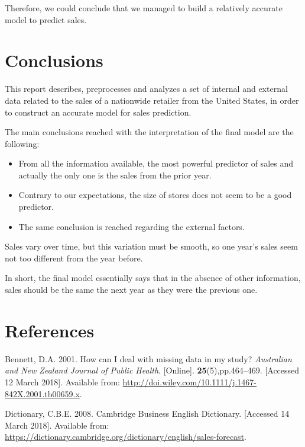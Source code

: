 \documentclass[11pt,]{article}
\providecommand{\tightlist}{%
  \setlength{\itemsep}{0pt}\setlength{\parskip}{0pt}}
\begin{document}
Therefore, we could conclude that we managed to build a relatively
accurate model to predict sales.

\section{Conclusions}\label{conclusions}

This report describes, preprocesses and analyzes a set of internal and
external data related to the sales of a nationwide retailer from the
United States, in order to construct an accurate model for sales
prediction.

The main conclusions reached with the interpretation of the final model
are the following:

\begin{itemize}
\tightlist
\item
  From all the information available, the most powerful predictor of
  sales and actually the only one is the sales from the prior year.
\item
  Contrary to our expectations, the size of stores does not seem to be a
  good predictor.
\item
  The same conclusion is reached regarding the external factors.
\end{itemize}

Sales vary over time, but this variation must be smooth, so one year's
sales seem not too different from the year before.

In short, the final model essentially says that in the absence of other
information, sales should be the same the next year as they were the
previous one.

\section*{References}\label{references}

\hypertarget{refs}{}
\hypertarget{ref-bennett_how_2001}{}
Bennett, D.A. 2001. How can I deal with missing data in my study?
\emph{Australian and New Zealand Journal of Public Health}.
{[}Online{]}. \textbf{25}(5),pp.464--469. {[}Accessed 12 March 2018{]}.
Available from:
\url{http://doi.wiley.com/10.1111/j.1467-842X.2001.tb00659.x}.

\hypertarget{ref-cambridge_business_english_dictionary_cambridge_2008}{}
Dictionary, C.B.E. 2008. Cambridge Business English Dictionary.
{[}Accessed 14 March 2018{]}. Available from:
\url{https://dictionary.cambridge.org/dictionary/english/sales-forecast}.
\end{document}
